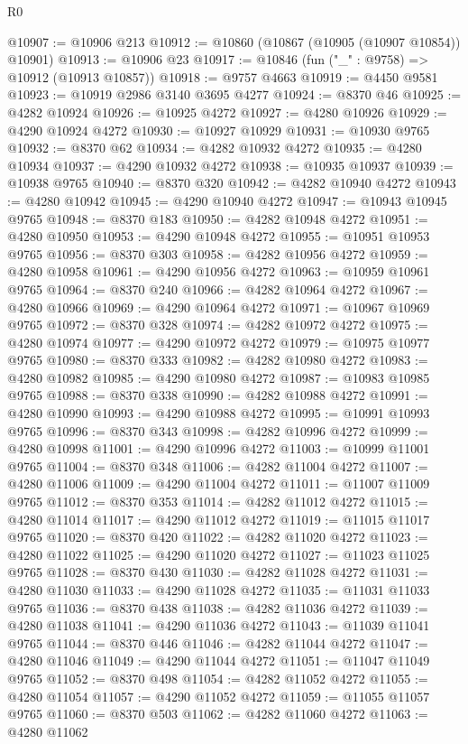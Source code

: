 \begin{lexlean}{R0}
\begin{coremodule}
@10907 := @10906 @213
@10912 := @10860 (@10867 (@10905 (@10907 @10854)) @10901)
@10913 := @10906 @23
@10917 := @10846 (fun ("_" : @9758) => @10912 (@10913 @10857))
@10918 := @9757 @4663
@10919 := @4450 @9581
@10923 := @10919 @2986 @3140 @3695 @4277
@10924 := @8370 @46
@10925 := @4282 @10924
@10926 := @10925 @4272
@10927 := @4280 @10926
@10929 := @4290 @10924 @4272
@10930 := @10927 @10929
@10931 := @10930 @9765
@10932 := @8370 @62
@10934 := @4282 @10932 @4272
@10935 := @4280 @10934
@10937 := @4290 @10932 @4272
@10938 := @10935 @10937
@10939 := @10938 @9765
@10940 := @8370 @320
@10942 := @4282 @10940 @4272
@10943 := @4280 @10942
@10945 := @4290 @10940 @4272
@10947 := @10943 @10945 @9765
@10948 := @8370 @183
@10950 := @4282 @10948 @4272
@10951 := @4280 @10950
@10953 := @4290 @10948 @4272
@10955 := @10951 @10953 @9765
@10956 := @8370 @303
@10958 := @4282 @10956 @4272
@10959 := @4280 @10958
@10961 := @4290 @10956 @4272
@10963 := @10959 @10961 @9765
@10964 := @8370 @240
@10966 := @4282 @10964 @4272
@10967 := @4280 @10966
@10969 := @4290 @10964 @4272
@10971 := @10967 @10969 @9765
@10972 := @8370 @328
@10974 := @4282 @10972 @4272
@10975 := @4280 @10974
@10977 := @4290 @10972 @4272
@10979 := @10975 @10977 @9765
@10980 := @8370 @333
@10982 := @4282 @10980 @4272
@10983 := @4280 @10982
@10985 := @4290 @10980 @4272
@10987 := @10983 @10985 @9765
@10988 := @8370 @338
@10990 := @4282 @10988 @4272
@10991 := @4280 @10990
@10993 := @4290 @10988 @4272
@10995 := @10991 @10993 @9765
@10996 := @8370 @343
@10998 := @4282 @10996 @4272
@10999 := @4280 @10998
@11001 := @4290 @10996 @4272
@11003 := @10999 @11001 @9765
@11004 := @8370 @348
@11006 := @4282 @11004 @4272
@11007 := @4280 @11006
@11009 := @4290 @11004 @4272
@11011 := @11007 @11009 @9765
@11012 := @8370 @353
@11014 := @4282 @11012 @4272
@11015 := @4280 @11014
@11017 := @4290 @11012 @4272
@11019 := @11015 @11017 @9765
@11020 := @8370 @420
@11022 := @4282 @11020 @4272
@11023 := @4280 @11022
@11025 := @4290 @11020 @4272
@11027 := @11023 @11025 @9765
@11028 := @8370 @430
@11030 := @4282 @11028 @4272
@11031 := @4280 @11030
@11033 := @4290 @11028 @4272
@11035 := @11031 @11033 @9765
@11036 := @8370 @438
@11038 := @4282 @11036 @4272
@11039 := @4280 @11038
@11041 := @4290 @11036 @4272
@11043 := @11039 @11041 @9765
@11044 := @8370 @446
@11046 := @4282 @11044 @4272
@11047 := @4280 @11046
@11049 := @4290 @11044 @4272
@11051 := @11047 @11049 @9765
@11052 := @8370 @498
@11054 := @4282 @11052 @4272
@11055 := @4280 @11054
@11057 := @4290 @11052 @4272
@11059 := @11055 @11057 @9765
@11060 := @8370 @503
@11062 := @4282 @11060 @4272
@11063 := @4280 @11062

\end{coremodule}
\end{lexlean}
